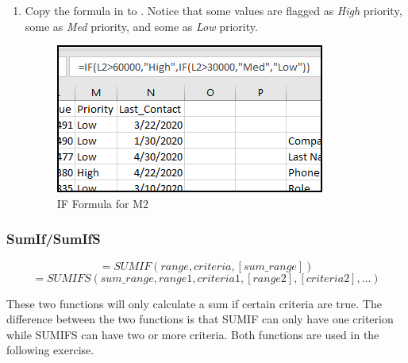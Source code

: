 \begin{enumbox}
\begin{enumerate}
		\item Copy the formula in  to . Notice that some values are flagged as \textit{High} priority, some as \textit{Med} priority, and some as \textit{Low} priority.
		
		\begin{figure}[H]
			\centering
			\includegraphics[width=\maxwidth{.75\linewidth}]{gfx/ch09_fig41}
			\caption{IF Formula for M2}
			\label{09:fig41}
		\end{figure}
		
	\end{enumerate}
\end{enumbox}
	
\subsubsection{SumIf/SumIfS}

\[ =SUMIF(range, criteria, [sum\_range]) \]
\[ =SUMIFS(sum\_range, range1, criteria1, [range2], [criteria2], ...) \]

These two functions will only calculate a sum if certain criteria are true. The difference between the two functions is that SUMIF can only have one criterion while SUMIFS can have two or more criteria. Both functions are used in the following exercise.

